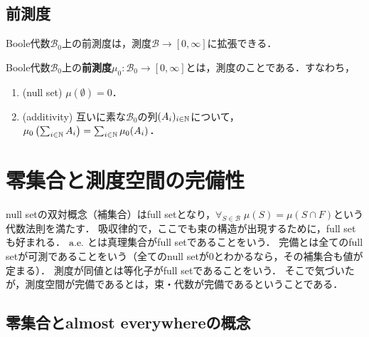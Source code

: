 \documentclass[uplatex, dvipdfmx]{jsreport}
\renewcommand{\B}{\mathcal{B}}
\begin{document}
\subsection{前測度}

\begin{tcolorbox}[colframe=ForestGreen, colback=ForestGreen!10!white,breakable,colbacktitle=ForestGreen!40!white,coltitle=black,fonttitle=\bfseries\sffamily,
title=]
    Boole代数$\B_0$上の前測度は，測度$\B\to[0,\infty]$に拡張できる．
\end{tcolorbox}

\begin{definition}
    Boole代数$\B_0$上の\textbf{前測度}$\mu_0:\B_0\to[0,\infty]$とは，測度のことである．すなわち，
    \begin{enumerate}
        \item (null set) $\mu(\emptyset)=0$．
        \item (additivity) 互いに素な$\B_0$の列$(A_i)_{i\in\mathbb{N}}$について，$\mu_0\left(\sum_{i\in\mathbb{N}}A_i\right)=\sum_{i\in\mathbb{N}}\mu_0(A_i)$．
    \end{enumerate}
\end{definition}

\section{零集合と測度空間の完備性}

\begin{tcolorbox}[colframe=ForestGreen, colback=ForestGreen!10!white,breakable,colbacktitle=ForestGreen!40!white,coltitle=black,fonttitle=\bfseries\sffamily,
title=距離空間には完備化があるべき，測度空間にも完備化が標準的に取れるべき．これをあくまでも代数構造から抽出する．]
    null setの双対概念（補集合）はfull setとなり，$\forall_{S\in\B}\;\mu(S)=\mu(S\cap F)$という代数法則を満たす．
    吸収律的で，ここでも束の構造が出現するために，full setも好まれる．
    $\mathrm{a.e.}\;$とは真理集合がfull setであることをいう．
    完備とは全てのfull setが可測であることをいう（全てのnull setが$0$とわかるなら，その補集合も値が定まる）．
    測度が同値とは等化子がfull setであることをいう．
    そこで気づいたが，測度空間が完備であるとは，束・代数が完備であるということである．
\end{tcolorbox}

\subsection{零集合とalmost everywhereの概念}
\end{document}
